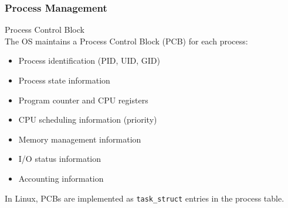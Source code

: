 \multend

\raggedcolumns
\columnbreak

\subsubsection{Process Management}

\begin{definition}{Process Control Block}\\
    The OS maintains a Process Control Block (PCB) for each process:
    \begin{itemize}
        \item Process identification (PID, UID, GID)
        \item Process state information
        \item Program counter and CPU registers
        \item CPU scheduling information (priority)
        \item Memory management information
        \item I/O status information
        \item Accounting information
    \end{itemize}
    
    In Linux, PCBs are implemented as \texttt{task\_struct} entries in the process table.
\end{definition}

